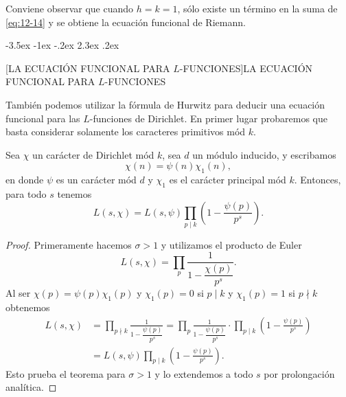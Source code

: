 \documentclass[12pt,a4paper]{book}
\makeatletter
\renewcommand\section{\@startsection{section}{1}{\z@}%
  {-3.5ex \@plus -1ex \@minus -.2ex}%
  {2.3ex \@plus .2ex}%
  {\normalfont\Large\bfseries\raggedright}}
\makeatother
\begin{document}
    Conviene observar que cuando $h=k=1$, sólo existe un término en la suma de
    \eqref{eq:12-14} y se obtiene la ecuación funcional de Riemann.

    \section[LA ECUACIÓN FUNCIONAL PARA \texorpdfstring{$L$}{L}-FUNCIONES]{LA ECUACIÓN FUNCIONAL PARA \texorpdfstring{$L$}{L}-FUNCIONES}

    También podemos utilizar la fórmula de Hurwitz para deducir una ecuación funcional para
    las $L$-funciones de Dirichlet. En primer lugar probaremos que basta considerar solamente
    los caracteres primitivos mód $k$.

    \begin{teorema}\label{teo:12-9}
        Sea $\chi$ un carácter de Dirichlet mód $k$, sea $d$ un módulo inducido, y escribamos
        \begin{equation*}
            \chi(n)=\psi(n)\chi_{1}(n),
        \end{equation*}
        en donde $\psi$ es un carácter mód $d$ y $\chi_{1}$ es el carácter principal mód $k$.
        Entonces, para todo $s$ tenemos
        \begin{equation*}
            L(s,\chi)=L(s,\psi)\prod_{p\mid k}\left(1-\frac{\psi(p)}{p^{s}}\right).
        \end{equation*}
    \end{teorema}

    \begin{proof}
        Primeramente hacemos $\sigma>1$ y utilizamos el producto de Euler
        \begin{equation*}
            L(s,\chi)=\prod_{p}\frac{1}{1-\dfrac{\chi(p)}{p^{s}}}.
        \end{equation*}
        Al ser $\chi(p)=\psi(p)\chi_{1}(p)$ y $\chi_{1}(p)=0$ si $p\mid k$ y $\chi_{1}(p)=1$ si
        $p\nmid k$ obtenemos
        \begin{align*}
            L(s,\chi)&=\prod_{p\nmid k}\frac{1}{1-\dfrac{\psi(p)}{p^{s}}}=\prod_{p}\frac{1}{1-\dfrac{\psi(p)}{p^{s}}}\cdot\prod_{p\mid k}\left(1-\frac{\psi(p)}{p^{s}}\right)\\
            &=L(s,\psi)\prod_{p\mid k}\left(1-\frac{\psi(p)}{p^{s}}\right).
        \end{align*}
        Esto prueba el teorema para $\sigma>1$ y lo extendemos a todo $s$ por prolongación
        analítica.
    \end{proof}
\end{document}

